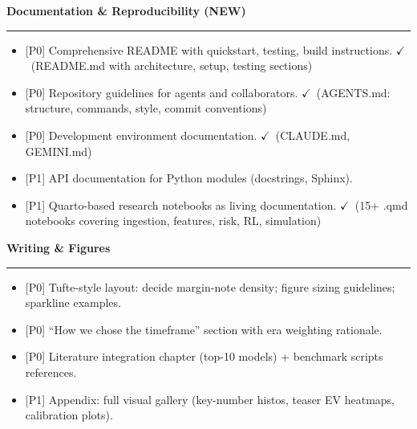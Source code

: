 \documentclass[11pt]{article}
\newcommand{\milestone}[1]{\vspace{0.5em}\noindent\textbf{\large #1}\par\vspace{0.25em}\hrule\vspace{0.5em}}
\newcommand{\done}{\textcolor{green!60!black}{\(\checkmark\)}}
\newcommand{\prio}[1]{\textcolor{blue!70!black}{[#1]}}
\begin{document}
\milestone{Documentation \& Reproducibility (NEW)}
\begin{itemize}
  \item \prio{P0} Comprehensive README with quickstart, testing, build instructions. \done\ (README.md with architecture, setup, testing sections)
  \item \prio{P0} Repository guidelines for agents and collaborators. \done\ (AGENTS.md: structure, commands, style, commit conventions)
  \item \prio{P0} Development environment documentation. \done\ (CLAUDE.md, GEMINI.md)
  \item \prio{P1} API documentation for Python modules (docstrings, Sphinx).
  \item \prio{P1} Quarto-based research notebooks as living documentation. \done\ (15+ .qmd notebooks covering ingestion, features, risk, RL, simulation)
\end{itemize}

\milestone{Writing \& Figures}
\begin{itemize}
  \item \prio{P0} Tufte-style layout: decide margin-note density; figure sizing guidelines; sparkline examples.
  \item \prio{P0} “How we chose the timeframe” section with era weighting rationale.
  \item \prio{P0} Literature integration chapter (top-10 models) + benchmark scripts references.
  \item \prio{P1} Appendix: full visual gallery (key-number histos, teaser EV heatmaps, calibration plots).
\end{itemize}
\end{document}

